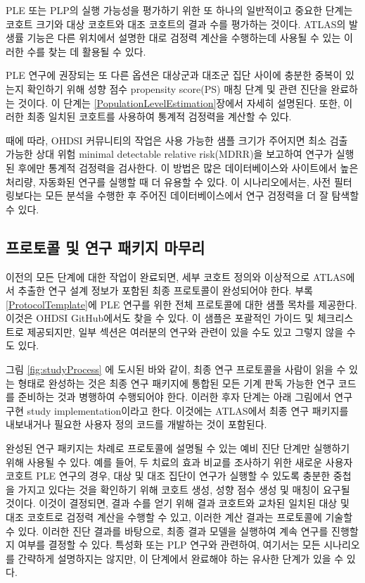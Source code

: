 \documentclass[10.5pt]{book}
\theoremstyle{definition}
\theoremstyle{definition}
\theoremstyle{definition}
\theoremstyle{remark}
\begin{document}
PLE 또는 PLP의 실행 가능성을 평가하기 위한 또 하나의 일반적이고 중요한
단계는 코호트 크기와 대상 코호트와 대조 코호트의 결과 수를 평가하는
것이다. ATLAS의 발생률 기능은 다른 위치에서 설명한 대로 검정력 계산을
수행하는데 사용될 수 있는 이러한 수를 찾는 데 활용될 수 있다.

PLE 연구에 권장되는 또 다른 옵션은 대상군과 대조군 집단 사이에 충분한
중복이 있는지 확인하기 위해 성향 점수 propensity score(PS) 매칭 단계 및
관련 진단을 완료하는 것이다. 이 단계는
\ref{PopulationLevelEstimation}장에서 자세히 설명된다. 또한, 이러한 최종
일치된 코호트를 사용하여 통계적 검정력을 계산할 수 있다.

때에 따라, OHDSI 커뮤니티의 작업은 사용 가능한 샘플 크기가 주어지면 최소
검출 가능한 상대 위험 minimal detectable relative risk(MDRR)을 보고하여
연구가 실행된 후에만 통계적 검정력을 검사한다. 이 방법은 많은
데이터베이스와 사이트에서 높은 처리량, 자동화된 연구를 실행할 때 더
유용할 수 있다. 이 시나리오에서는, 사전 필터링보다는 모든 분석을 수행한
후 주어진 데이터베이스에서 연구 검정력을 더 잘 탐색할 수 있다.

\subsection{프로토콜 및 연구 패키지 마무리}\label{----}

이전의 모든 단계에 대한 작업이 완료되면, 세부 코호트 정의와 이상적으로
ATLAS에서 추출한 연구 설계 정보가 포함된 최종 프로토콜이 완성되어야
한다. 부록 \ref{ProtocolTemplate}에 PLE 연구를 위한 전체 프로토콜에 대한
샘플 목차를 제공한다. 이것은 OHDSI GitHub에서도 찾을 수 있다. 이 샘플은
포괄적인 가이드 및 체크리스트로 제공되지만, 일부 섹션은 여러분의 연구와
관련이 있을 수도 있고 그렇지 않을 수도 있다.

그림 \ref{fig:studyProcess} 에 도시된 바와 같이, 최종 연구 프로토콜을
사람이 읽을 수 있는 형태로 완성하는 것은 최종 연구 패키지에 통합된 모든
기계 판독 가능한 연구 코드를 준비하는 것과 병행하여 수행되어야 한다.
이러한 후자 단계는 아래 그림에서 연구 구현 study implementation이라고
한다. 이것에는 ATLAS에서 최종 연구 패키지를 내보내거나 필요한 사용자
정의 코드를 개발하는 것이 포함된다.

완성된 연구 패키지는 차례로 프로토콜에 설명될 수 있는 예비 진단 단계만
실행하기 위해 사용될 수 있다. 예를 들어, 두 치료의 효과 비교를 조사하기
위한 새로운 사용자 코호트 PLE 연구의 경우, 대상 및 대조 집단이 연구가
실행할 수 있도록 충분한 중첩을 가지고 있다는 것을 확인하기 위해 코호트
생성, 성향 점수 생성 및 매칭이 요구될 것이다. 이것이 결정되면, 결과 수를
얻기 위해 결과 코호트와 교차된 일치된 대상 및 대조 코호트로 검정력
계산을 수행할 수 있고, 이러한 계산 결과는 프로토콜에 기술할 수 있다.
이러한 진단 결과를 바탕으로, 최종 결과 모델을 실행하여 계속 연구를
진행할지 여부를 결정할 수 있다. 특성화 또는 PLP 연구와 관련하여,
여기서는 모든 시나리오를 간략하게 설명하지는 않지만, 이 단계에서
완료해야 하는 유사한 단계가 있을 수 있다.
\end{document}
